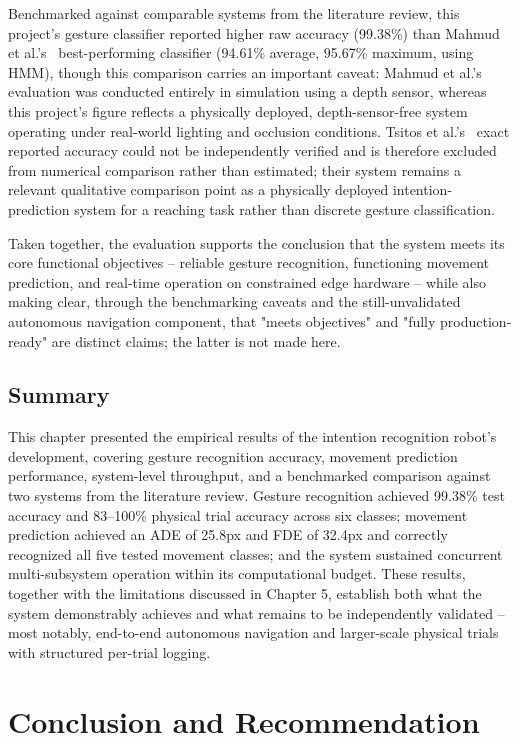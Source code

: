 Benchmarked against comparable systems from the literature review, this project's
gesture classifier reported higher raw accuracy (99.38\%) than Mahmud et
al.'s~\cite{mahmud2022} best-performing classifier (94.61\% average, 95.67\% maximum,
using HMM), though this comparison carries an important caveat: Mahmud et al.'s
evaluation was conducted entirely in simulation using a depth sensor, whereas this
project's figure reflects a physically deployed, depth-sensor-free system operating
under real-world lighting and occlusion conditions. Tsitos et al.'s~\cite{tsitos2022}
exact reported accuracy could not be independently verified and is therefore
excluded from numerical comparison rather than estimated; their system remains a
relevant qualitative comparison point as a physically deployed intention-prediction
system for a reaching task rather than discrete gesture classification.

Taken together, the evaluation supports the conclusion that the system meets its core
functional objectives -- reliable gesture recognition, functioning movement
prediction, and real-time operation on constrained edge hardware -- while also making
clear, through the benchmarking caveats and the still-unvalidated autonomous
navigation component, that "meets objectives" and "fully production-ready" are
distinct claims; the latter is not made here.

\section{Summary}

This chapter presented the empirical results of the intention recognition robot's
development, covering gesture recognition accuracy, movement prediction performance,
system-level throughput, and a benchmarked comparison against two systems from the
literature review. Gesture recognition achieved 99.38\% test accuracy and 83--100\%
physical trial accuracy across six classes; movement prediction achieved an ADE of
25.8px and FDE of 32.4px and correctly recognized all five tested movement classes;
and the system sustained concurrent multi-subsystem operation within its
computational budget. These results, together with the limitations discussed in
Chapter 5, establish both what the system demonstrably achieves and what remains to
be independently validated -- most notably, end-to-end autonomous navigation and
larger-scale physical trials with structured per-trial logging.

\chapter{Conclusion and Recommendation}


